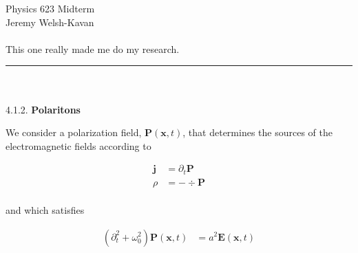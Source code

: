 \documentclass[]{article}
\begin{document}
{\Large Physics 623 Midterm}\\
{Jeremy Welsh-Kavan}\\
\hfill \\

This one really made me do my research. \\
\noindent\rule{15cm}{0.4pt} \\
\hfill \\

4.1.2. { \bf Polaritons} \\
\hfill

We consider a polarization field, $\bm{P}(\bm{x}, t)$, that determines the sources of the electromagnetic fields according to

\begin{equation}
\begin{split}
\bm{j} & = \partial_t \bm{P} \\
\rho & = - \div \bm{P} \\
\end{split}
\end{equation}

and which satisfies

\begin{equation}
\begin{split}
(\partial_t^2 + \omega_0^2) \bm{P}(\bm{x}, t) & = a^2 \bm{E}(\bm{x}, t) \\
\end{split}
\end{equation}
\end{document}
